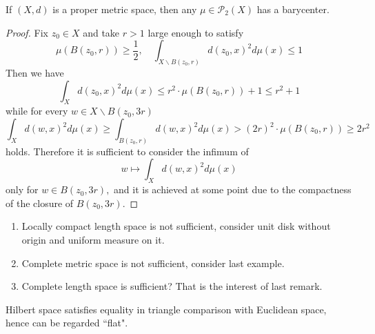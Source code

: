 \begin{lem}[Lemma 3.2]
	If \( ( X , d ) \) is a proper metric space, then any \( \mu \in \mathcal { P } _ { 2 } ( X ) \) has a barycenter.
\end{lem}

\begin{proof}
	Fix \( z _ { 0 } \in X \) and take \( r > 1 \) large enough to satisfy
	\[ \mu \left( B \left( z _ { 0 } , r \right) \right) \geq \frac { 1 } { 2 } , \quad \int _ { X \backslash B \left( z _ { 0 } , r \right) } d \left( z _ { 0 } , x \right) ^ { 2 } d \mu ( x ) \leq 1 \]
	Then we have
	\[ \int _ { X } d \left( z _ { 0 } , x \right) ^ { 2 } d \mu ( x ) \leq r ^ { 2 } \cdot \mu \left( B \left( z _ { 0 } , r \right) \right) + 1 \leq r ^ { 2 } + 1 \]
	while for every \( w \in X \backslash B \left( z _ { 0 } , 3 r \right) \)
	\[ \int _ { X } d ( w , x ) ^ { 2 } d \mu ( x ) \geq \int _ { B \left( z _ { 0 } , r \right) } d ( w , x ) ^ { 2 } d \mu ( x ) > ( 2 r ) ^ { 2 } \cdot \mu \left( B \left( z _ { 0 } , r \right) \right) \geq 2 r ^ { 2 } \]
	holds. Therefore it is sufficient to consider the infimum of
	\[ w \longmapsto \int _ { X } d ( w , x ) ^ { 2 } d \mu ( x ) \]
	only for \( w \in B \left( z _ { 0 } , 3 r \right) , \) and it is achieved at some point due to the compactness of the closure of \( B \left( z _ { 0 } , 3 r \right) . \)
\end{proof}

\begin{rmk}
	\begin{enumerate}
		\item Locally compact length space is not sufficient, consider unit disk without origin and uniform measure on it.
		\item Complete metric space is not sufficient, consider last example.
		\item Complete length space is sufficient? That is the interest of last remark.
	\end{enumerate}
\end{rmk}
\begin{rmk}[Example 2.1 c]
	Hilbert space satisfies equality in triangle comparison with Euclidean space, hence can be regarded ``flat".
\end{rmk}


